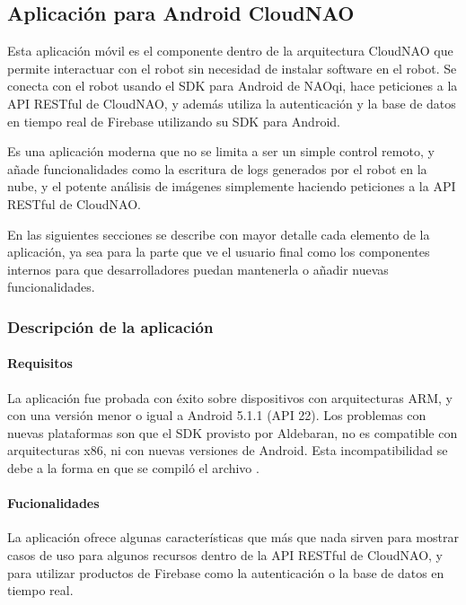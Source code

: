 \subsection{Aplicación para Android CloudNAO}
\label{\detokenize{introduction:welcome-to-cloudnao-android-s-documentation}}
Esta aplicación móvil es el componente dentro de la arquitectura CloudNAO
que permite interactuar con el robot sin necesidad de instalar software en el
robot. Se conecta con el robot usando el SDK para Android de NAOqi, hace peticiones
a la API RESTful de CloudNAO, y además utiliza la autenticación
y la base de datos en tiempo real de Firebase utilizando su SDK para Android.

Es una aplicación moderna que no se limita a ser un simple control remoto, y
añade funcionalidades como la escritura de logs generados por el robot en la nube,
y el potente análisis de imágenes simplemente haciendo peticiones a la API
RESTful de CloudNAO.

En las siguientes secciones se describe con mayor detalle cada elemento de la
aplicación, ya sea para la parte que ve el usuario final como los componentes
internos para que desarrolladores puedan mantenerla o añadir nuevas
funcionalidades.

\subsubsection{Descripción de la aplicación}
\paragraph{Requisitos}
\label{\detokenize{users_docs:requisitos}}
La aplicación fue probada con éxito sobre dispositivos con arquitecturas ARM,
y con una versión menor o igual a Android 5.1.1 (API 22). Los problemas con
nuevas plataformas son que el SDK provisto por Aldebaran, no es compatible con
arquitecturas x86, ni con nuevas versiones de Android. Esta incompatibilidad
se debe a la forma en que se compiló el archivo
.


\paragraph{Fucionalidades}
\label{\detokenize{users_docs:fucionalidades}}
La aplicación ofrece algunas características que más que nada sirven para
mostrar casos de uso para algunos recursos dentro de la API RESTful
de CloudNAO, y para utilizar productos de Firebase como la autenticación
o la base de datos en tiempo real.


